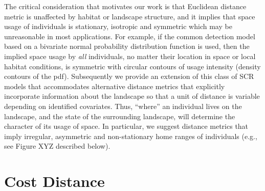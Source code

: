 \documentclass[12pt]{article}
\begin{document}
The critical consideration that motivates our work is that
 Euclidean distance metric is unaffected by habitat or landscape
structure, and it implies that space usage of individuals is
stationary, isotropic and symmetric which may be unreasonable in most
applications.  For example, if the common detection model based on a
bivariate
normal probability distribution function is used, then the implied
space
usage by {\it all} individuals, no matter their location in space or
local habitat conditions, is symmetric with circular contours of
usage intensity (density contours of the pdf).
Subsequently we provide an extension of this class of SCR models that
accommodates alternative distance metrics that explicitly incorporate
information about the landscape so that a unit of distance is variable
depending on identified covariates. Thus, ``where'' an individual
lives on the landscape, and the state of the surrounding landscape,
will determine the character of its usage of space. In particular, we
suggest distance metrics that imply irregular, asymmetric and
non-stationary home ranges of individuals (e.g., see Figure XYZ
described
below).


\section{Cost Distance}
\end{document}
